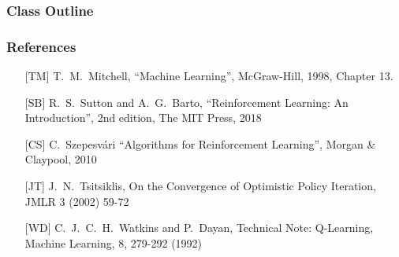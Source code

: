         \title[\whatshort, \simplenum, 
Slide \insertframenumber/\inserttotalframenumber ] {\what}

 

\subtitle{Class \simplenum: Reinforcement Learning}



\usepackage{graphicx}



\begin{frame}
  \titlepage

\end{frame}

\begin{frame}
  \frametitle{Class Outline} \tableofcontents %
\end{frame}




\begin{frame}[fragile]
\frametitle{References}

\begin{itemize}

\item[[TM{]}] T.~M.~Mitchell, ``Machine Learning'', McGraw-Hill, 1998,
  Chapter 13.

\item[[SB{]}] R.~S.~Sutton and A.~G.~Barto, 
``Reinforcement Learning: An Introduction'', 2nd edition, The MIT
Press, 2018

\item[[CS{]}]  C.~Szepesv\'ari
``Algorithms for Reinforcement Learning'', Morgan \& Claypool, 2010

\item[[JT{]}] J.~N.~Tsitsiklis, On the Convergence of Optimistic Policy
Iteration, JMLR 3 (2002) 59-72

\item[[WD{]}] C.~J.~C.~H.~Watkins and P.~Dayan, Technical Note:
Q-Learning, Machine Learning, 8, 279-292 (1992)

\end{itemize}
\end{frame}


